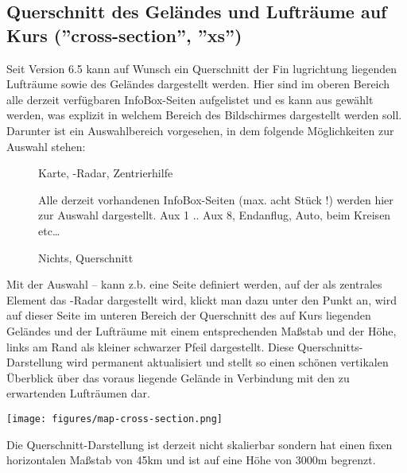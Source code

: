 \subsection*{Querschnitt des Geländes und Lufträume auf Kurs (''cross-section'', ''xs'')}
\label{cross-section}

Seit Version 6.5 kann auf Wunsch  ein Querschnitt der Fin lugrichtung liegenden
 Lufträume sowie des Geländes
dargestellt werden. Hier sind im oberen Bereich alle derzeit verfügbaren InfoBox-Seiten
aufgelistet und es kann aus gewählt werden, was explizit in welchem Bereich des Bildschirmes
  dargestellt werden soll.
 Darunter ist ein Auswahlbereich vorgesehen, in dem folgende
Möglichkeiten zur Auswahl stehen:
 \begin{description}
 \item[] Karte, \fl-Radar, Zentrierhilfe
 \item[] Alle derzeit vorhandenen InfoBox-Seiten (max. acht Stück !) werden hier
     zur Auswahl dargestellt. Aux 1 .. Aux 8, Endanflug, Auto, beim Kreisen etc\dots
 \item[] Nichts, Querschnitt
 \end{description}

Mit der Auswahl -- kann z.b. eine Seite definiert werden,
auf der als zentrales Element das \fl-Radar dargestellt wird, klickt man dazu unter
 den Punkt an, wird auf dieser Seite im unteren Bereich der
Querschnitt des auf Kurs liegenden Geländes und der Lufträume mit einem entsprechenden
Maßstab und der Höhe, links am Rand als kleiner schwarzer Pfeil dargestellt. Diese
Querschnitts-Darstellung  wird permanent aktualisiert und stellt so einen schönen  vertikalen
Überblick über das voraus liegende Gelände in Verbindung mit den zu erwartenden Lufträumen
dar.

\begin{center}
\hspace{7.5em}\texttt{[image: figures/map-cross-section.png]}
\end{center}

Die Querschnitt-Darstellung ist  derzeit nicht skalierbar sondern hat einen fixen horizontalen
Maßstab von 45km und ist auf eine Höhe von 3000m begrenzt.

